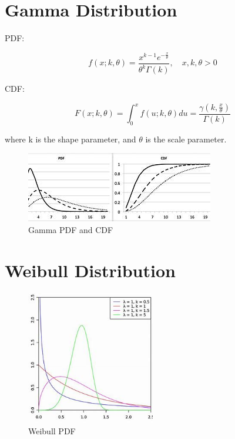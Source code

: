 \documentclass[12pt, a4paper]{report}
\newcommand\ddfrac[2]{\frac{\displaystyle #1}{\displaystyle #2}}
\begin{document}
  \section{Gamma Distribution}

  PDF:

  \begin{equation}
    f(x;k,\theta) = \ddfrac{x^{k-1}e^{-\ddfrac{x}{\theta}}}{\theta^k \Gamma(k)}, \quad x, k, \theta > 0
  \end{equation}

  CDF:

  \begin{equation}
    F(x;k,\theta) = \int_{0}^{x} f(u;k,\theta)du = \frac{\gamma \left( k, \frac{x}{\theta} \right)}{\Gamma(k)}
  \end{equation}

  where k is the shape parameter, and $ \theta $ is the scale parameter.

  \begin{figure}
    \centering
    \includegraphics{figures/gamma}
    \caption{Gamma PDF and CDF}
  \end{figure}

  \section{Weibull Distribution}

  \begin{figure}
    \centering
    \normalsize
    \includegraphics[width=0.5\textwidth]{figures/weibull}
    \caption{Weibull PDF}
  \end{figure}
\end{document}
